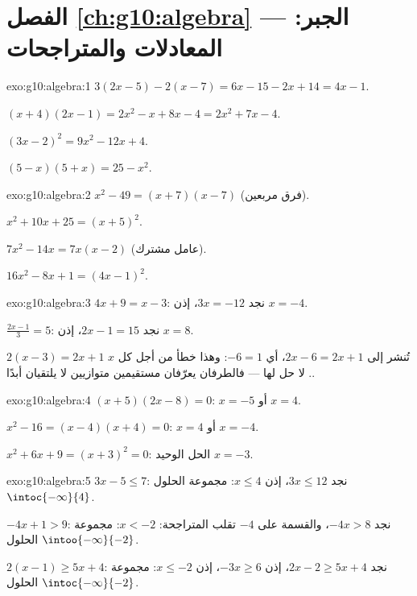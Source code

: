 \section*{الفصل \ref{ch:g10:algebra} --- الجبر: المعادلات والمتراجحات}

\begin{solution}{exo:g10:algebra:1}
$3(2x-5) - 2(x-7) = 6x - 15 - 2x + 14 = 4x - 1$.

$(x+4)(2x-1) = 2x^2 - x + 8x - 4 = 2x^2 + 7x - 4$.

$(3x-2)^2 = 9x^2 - 12x + 4$.

$(5-x)(5+x) = 25 - x^2$.
\end{solution}

\begin{solution}{exo:g10:algebra:2}
$x^2 - 49 = (x+7)(x-7)$ (فرق مربعين).

$x^2 + 10x + 25 = (x+5)^2$.

$7x^2 - 14x = 7x(x - 2)$ (عامل مشترك).

$16x^2 - 8x + 1 = (4x - 1)^2$.
\end{solution}

\begin{solution}{exo:g10:algebra:3}
$4x + 9 = x - 3$: نجد $3x = -12$، إذن $x = -4$.

$\frac{2x-1}{3} = 5$: نجد $2x - 1 = 15$، إذن $x = 8$.

$2(x-3) = 2x + 1$ تُنشر إلى $2x - 6 = 2x + 1$، أي $-6 = 1$: وهذا خطأ من أجل
كل $x$. لا حل لها --- فالطرفان يعرّفان مستقيمين متوازيين لا
يلتقيان أبدًا.
\end{solution}

\begin{solution}{exo:g10:algebra:4}
$(x+5)(2x-8) = 0$: $x = -5$ أو $x = 4$.

$x^2 - 16 = (x-4)(x+4) = 0$: $x = 4$ أو $x = -4$.

$x^2 + 6x + 9 = (x+3)^2 = 0$: الحل الوحيد $x = -3$.
\end{solution}

\begin{solution}{exo:g10:algebra:5}
$3x - 5 \leq 7$: نجد $3x \leq 12$، إذن $x \leq 4$: مجموعة الحلول
$\intoc{-\infty}{4}$.

$-4x + 1 > 9$: نجد $-4x > 8$، والقسمة على $-4$ تقلب المتراجحة:
$x < -2$: مجموعة الحلول $\intoo{-\infty}{-2}$.

$2(x-1) \geq 5x + 4$: نجد $2x - 2 \geq 5x + 4$، إذن $-3x \geq 6$، إذن
$x \leq -2$: مجموعة الحلول $\intoc{-\infty}{-2}$.
\end{solution}


